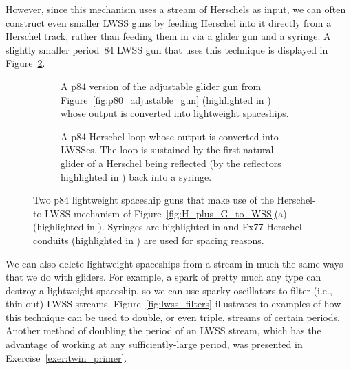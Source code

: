 However, since this mechanism uses a stream of Herschels as input, we can often construct even smaller LWSS guns by feeding Herschel into it directly from a Herschel track, rather than feeding them in via a glider gun and a syringe. A slightly smaller period~$84$ LWSS gun that uses this technique is displayed in Figure~\ref{fig:p84_lwss_gun}.

\begin{figure}[!htb]
	\centering
	\begin{subfigure}{0.45\textwidth}
		\centering
		\caption{A p$84$ version of the adjustable glider gun from Figure~\ref{fig:p80_adjustable_gun} (highlighted in ) whose output is converted into lightweight spaceships.}\label{fig:p84_lwss_gun_adjustable}
	\end{subfigure} \hfill \begin{subfigure}{0.52\textwidth}
		\centering
		\caption{A p$84$ Herschel loop whose output is converted into LWSSes. The loop is sustained by the first natural glider of a Herschel being reflected (by the reflectors highlighted in ) back into a syringe.}\label{fig:p84_lwss_gun}
	\end{subfigure}
	\caption{Two p$84$ lightweight spaceship guns that make use of the Herschel-to-LWSS mechanism of Figure~\ref{fig:H_plus_G_to_WSS}(a) (highlighted in ). Syringes are highlighted in  and Fx77 Herschel conduits (highlighted in ) are used for spacing reasons.}\label{fig:p84_lwss_gun_both}
\end{figure}


We can also delete lightweight spaceships from a stream in much the same ways that we do with gliders. For example, a spark of pretty much any type can destroy a lightweight spaceship, so we can use sparky oscillators to filter (i.e., thin out) LWSS streams. Figure~\ref{fig:lwss_filters} illustrates to examples of how this technique can be used to double, or even triple, streams of certain periods. Another method of doubling the period of an LWSS stream, which has the advantage of working at any sufficiently-large period, was presented in Exercise~\ref{exer:twin_primer}.

